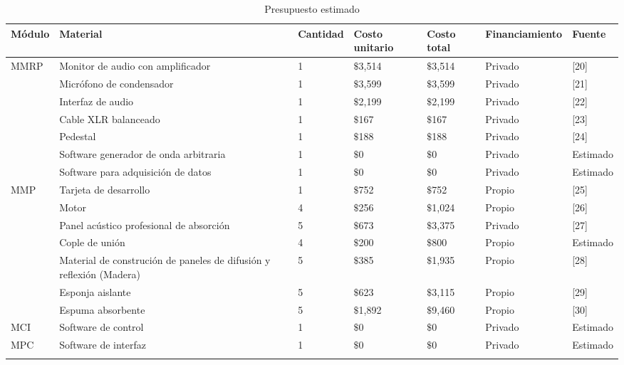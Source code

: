 \begin{center}
\scriptsize
    \begin{longtable}[!htb]{| m{4em} | m{8em} | m{4.5em}| m{4em}| m{3em}| m{8em}| m{4em}|}
    \hline
    \textbf{M\'odulo}& \textbf{Material} & \textbf{Cantidad} & \textbf{Costo unitario} & \textbf{Costo total} & \textbf{Financiamiento} & \textbf{Fuente}\\
    \hline\hline
    \multirow{7}{*}{MMRP} 
    & Monitor de audio con amplificador & 1 & $\$$3,514 & $\$$3,514 & Privado & [20]\\
    \cline{2-7}
    & Micr\'ofono de condensador & 1 & $\$$3,599 & $\$$3,599 & Privado & [21]\\
    \cline{2-7}
    & Interfaz de audio & 1 & $\$$2,199 & $\$$2,199 & Privado & [22]\\
    \cline{2-7}
    & Cable XLR balanceado & 1 & $\$$167 & $\$$167 & Privado & [23]\\
    \cline{2-7}
    & Pedestal & 1 & $\$$188 & $\$$188 & Privado & [24]\\
    \cline{2-7}
    & Software generador de onda arbitraria & 1 & $\$$0 & $\$$0 & Privado & Estimado\\
    \cline{2-7}
    & Software para adquisici\'on de datos & 1 & $\$$0 & $\$$0 & Privado & Estimado\\
    \hline

    \multirow{5}{*}{MMP} 
    & Tarjeta de desarrollo & 1 & $\$$752 & $\$$752 & Propio & [25]\\
    \cline{2-7}
    & Motor & 4 & $\$$256 & $\$$1,024 & Propio & [26]\\
    \cline{2-7}
    & Panel ac\'ustico profesional de absorci\'on & 5 & $\$$673 & $\$$3,375 & Privado & [27]\\
    \cline{2-7}
    & Cople de uni\'on  & 4 & $\$$200 & $\$$800 & Propio & Estimado\\
    \cline{2-7}
    & Material de construci\'on de paneles de difusi\'on  y reflexi\'on (Madera) & 5 & $\$$385 & $\$$1,935 & Propio & [28]\\
    \hline

    & Esponja aislante & 5 & $\$$623 & $\$$3,115 & Propio & [29]\\
    \hline
    
    & Espuma absorbente & 5 & $\$$1,892 & $\$$9,460 & Propio & [30]\\
    \hline

    MCI & Software de control  & 1 & $\$$0 & $\$$0 & Privado & Estimado\\
    \hline
    MPC & Software de interfaz & 1 & $\$$0 & $\$$0 & Privado & Estimado\\
    \hline
    
    \caption{Presupuesto estimado}
    \label{tab:Presupuesto}
    \end{longtable}
\end{center}


